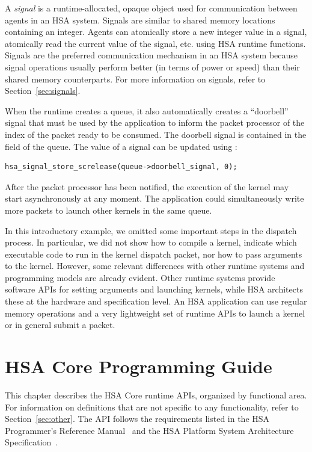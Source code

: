 \documentclass[final,oneside]{book}
\begin{document}
A \emph{signal} is a runtime-allocated, opaque object used for communication
between agents in an HSA system. Signals are similar to shared memory
locations containing an integer. Agents can atomically store a new integer
value in a signal, atomically read the current value of the signal, etc. using
HSA runtime functions.  Signals are the preferred communication mechanism in an
HSA system because signal operations usually perform better (in terms of power
or speed) than their shared memory counterparts. For more information on
signals, refer to Section~\ref{sec:signals}.

When the runtime creates a queue, it also automatically creates a ``doorbell''
signal that must be used by the application to inform the packet processor of
the index of the packet ready to be consumed. The doorbell signal is contained
in the  field of the queue. The value of a
signal can be updated using :

\begin{lstlisting}
hsa_signal_store_screlease(queue->doorbell_signal, 0);
\end{lstlisting}

After the packet processor has been notified, the execution of the kernel may
start asynchronously at any moment. The application could simultaneously write
more packets to launch other kernels in the same queue.

In this introductory example, we omitted some important steps in the dispatch
process. In particular, we did not show how to compile a kernel, indicate which
executable code to run in the kernel dispatch packet, nor how to pass arguments
to the kernel. However, some relevant differences with other runtime systems and
programming models are already evident.  Other runtime systems provide software
APIs for setting arguments and launching kernels, while HSA architects these at
the hardware and specification level. An HSA application can use regular memory
operations and a very lightweight set of runtime APIs to launch a kernel or in
general submit a packet.


\chapter{HSA Core Programming Guide} \label{coreapi}

This chapter describes the HSA Core runtime APIs, organized by functional
area. For information on definitions that are not specific to any functionality,
refer to Section~\ref{sec:other}. The API follows the requirements listed in the
HSA Programmer's Reference Manual~\cite{prm} and the HSA Platform System
Architecture Specification~\cite{sar}.
\end{document}
